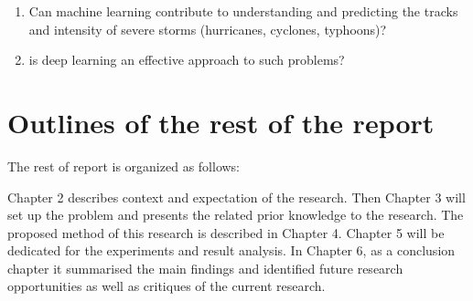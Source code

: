 \begin{enumerate}[label=\zdyxh*., leftmargin=5em]
	\item  Can machine learning contribute to understanding and predicting the tracks and intensity of severe storms (hurricanes, cyclones, typhoons)? 
	\item is deep learning an effective approach to such problems?
\end{enumerate}




\section{Outlines of the rest of the report}
The rest of report is organized as follows:

Chapter 2 describes context and expectation of the research. Then Chapter 3 will set up the problem and presents the related prior knowledge to the research. The proposed method of this research is described in Chapter 4. Chapter 5 will be dedicated for the experiments and result analysis. In Chapter 6, as a conclusion chapter it summarised the main findings and identified future research opportunities as well as critiques of the current research.


